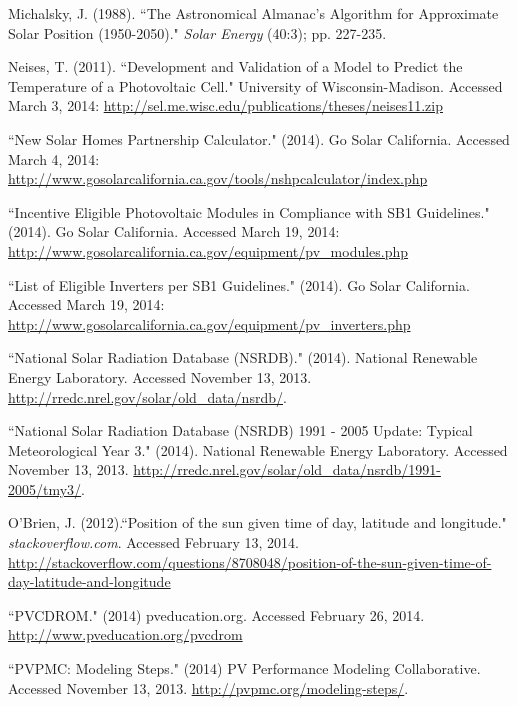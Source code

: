 \documentclass[12pt,letterpaper]{article}
\begin{document}
\begin{thebibliography}{99}
 Michalsky, J. (1988). ``The Astronomical Almanac's Algorithm for Approximate Solar Position (1950-2050)." \textit{Solar Energy} (40:3); pp. 227-235.

 Neises, T. (2011). ``Development and Validation of a Model to Predict the Temperature of a Photovoltaic Cell." University of Wisconsin-Madison. Accessed March 3, 2014: \url{http://sel.me.wisc.edu/publications/theses/neises11.zip}

 ``New Solar Homes Partnership Calculator." (2014). Go Solar California. Accessed March 4, 2014: \url{http://www.gosolarcalifornia.ca.gov/tools/nshpcalculator/index.php}

 ``Incentive Eligible Photovoltaic Modules in Compliance with SB1 Guidelines." (2014). Go Solar California. Accessed March 19, 2014:
 \url{http://www.gosolarcalifornia.ca.gov/equipment/pv_modules.php}

 ``List of Eligible Inverters per SB1 Guidelines." (2014). Go Solar California. Accessed March 19, 2014:
 \url{http://www.gosolarcalifornia.ca.gov/equipment/pv_inverters.php}

 ``National Solar Radiation Database (NSRDB)." (2014). National Renewable Energy Laboratory.  Accessed November 13, 2013. \url{http://rredc.nrel.gov/solar/old_data/nsrdb/}.

 ``National Solar Radiation Database (NSRDB) 1991 - 2005 Update: Typical Meteorological Year 3." (2014). National Renewable Energy Laboratory. Accessed November 13, 2013. \url{http://rredc.nrel.gov/solar/old\_data/nsrdb/1991-2005/tmy3/}.

 O'Brien, J. (2012).``Position of the sun given time of day, latitude and longitude." \textit{stackoverflow.com}. Accessed February 13, 2014. \url{http://stackoverflow.com/questions/8708048/position-of-the-sun-given-time-of-day-latitude-and-longitude}

 ``PVCDROM." (2014) pveducation.org. Accessed February 26, 2014. \url{http://www.pveducation.org/pvcdrom}

``PVPMC: Modeling Steps." (2014) PV Performance Modeling Collaborative. Accessed November 13, 2013. \url{http://pvpmc.org/modeling-steps/}.


\end{thebibliography}
\end{document}
